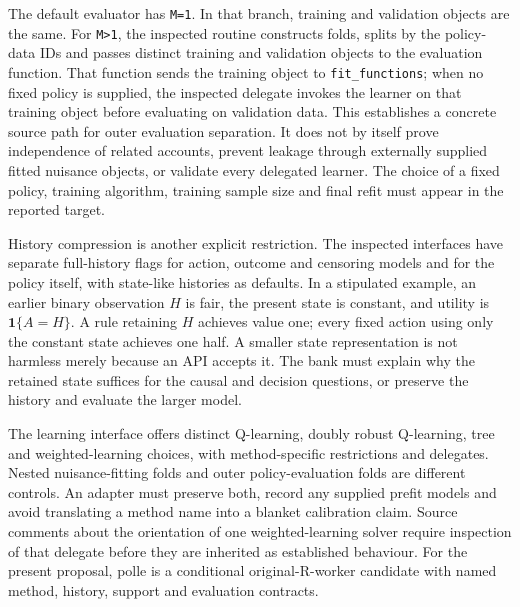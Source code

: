 The default evaluator has \texttt{M=1}. In that branch, training and validation
objects are the same. For \texttt{M>1}, the inspected routine constructs folds,
splits by the policy-data IDs and passes distinct training and validation objects
to the evaluation function. That function sends the training object to
\texttt{fit\_functions}; when no fixed policy is supplied, the inspected delegate
invokes the learner on that training object before evaluating on validation data.
This establishes a concrete source path for outer evaluation separation. It does
not by itself prove independence of related accounts, prevent leakage through
externally supplied fitted nuisance objects, or validate every delegated learner.
The choice of a fixed policy, training algorithm, training sample size and final
refit must appear in the reported target.~\citep{exec24_policiesr_polle}

History compression is another explicit restriction. The inspected interfaces have
separate full-history flags for action, outcome and censoring models and for the
policy itself, with state-like histories as defaults. In a stipulated example,
an earlier binary observation $H$ is fair, the present state is constant, and utility
is $\mathbf1\{A=H\}$. A rule retaining $H$ achieves value one; every fixed action
using only the constant state achieves one half. A smaller state representation is
not harmless merely because an API accepts it. The bank must explain why the
retained state suffices for the causal and decision questions, or preserve the
history and evaluate the larger model.~\citep{exec24_policiesr_polle,exec24_policiesr_reference}

The learning interface offers distinct Q-learning, doubly robust Q-learning, tree
and weighted-learning choices, with method-specific restrictions and delegates.
Nested nuisance-fitting folds and outer policy-evaluation folds are different
controls. An adapter must preserve both, record any supplied prefit models and
avoid translating a method name into a blanket calibration claim. Source comments
about the orientation of one weighted-learning solver require inspection of that
delegate before they are inherited as established behaviour. For the present
proposal, polle is a conditional original-R-worker candidate with named method,
history, support and evaluation contracts.~\citep{exec24_policiesr_polle}

